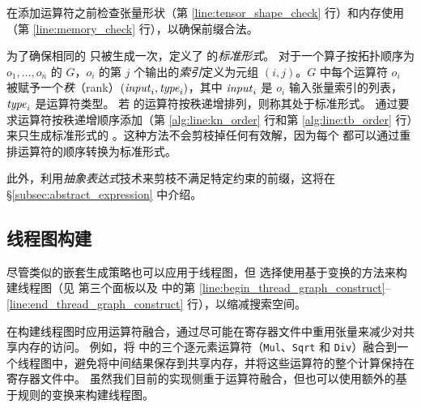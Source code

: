 \sys 在添加运算符之前检查张量形状（第 \ref{line:tensor_shape_check} 行）和内存使用（第 \ref{line:memory_check} 行），以确保前缀合法。

为了确保相同的 \graphs 只被生成一次，\sys 定义了 \graphs 的{\em 标准形式}。
对于一个算子按拓扑顺序为 $o_1, \ldots, o_n$ 的 \graph $G$，$o_i$ 的第 $j$ 个输出的{\em 索引}定义为元组 $(i, j)$。$G$ 中每个运算符 $o_i$ 被赋予一个{\em 秩}（rank）$(\mathit{input}_i, \mathit{type}_i)$，其中 $\mathit{input}_i$ 是 $o_i$ 输入张量索引的列表，$\mathit{type}_i$ 是运算符类型。
若 \graph 的运算符按秩递增排列，则称其处于标准形式。
\sys 通过要求运算符按秩递增顺序添加（第 \ref{alg:line:kn_order} 行和第 \ref{alg:line:tb_order} 行）来只生成标准形式的 \graphs。这种方法不会剪枝掉任何有效解，因为每个 \graph 都可以通过重排运算符的顺序转换为标准形式。

此外，\sys 利用{\em 抽象表达式}技术来剪枝不满足特定约束的前缀，这将在 \S\ref{subsec:abstract_expression} 中介绍。

\subsection{线程图构建}
\label{subsec:thread_graph_construction}

尽管类似的嵌套生成策略也可以应用于线程图，但 \sys 选择使用基于变换的方法来构建线程图（见  第三个面板以及  中的第 \ref{line:begin_thread_graph_construct}--\ref{line:end_thread_graph_construct} 行），以缩减搜索空间。

\sys 在构建线程图时应用运算符融合，通过尽可能在寄存器文件中重用张量来减少对共享内存的访问。
例如，\sys 将  中的三个逐元素运算符（{\tt Mul}、{\tt Sqrt} 和 {\tt Div}）融合到一个线程图中，避免将中间结果保存到共享内存，并将这些运算符的整个计算保持在寄存器文件中。
虽然我们目前的实现侧重于运算符融合，但也可以使用额外的基于规则的变换来构建线程图。

